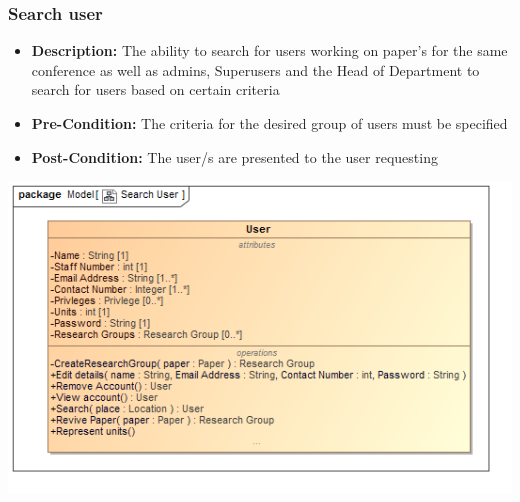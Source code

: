 \documentclass[11pt]{article}
\begin{document}
		\subsubsection{Search user}
		\begin{itemize}
			\item \textbf{Description: }The ability to search for users working on paper's for the same conference as well as admins, Superusers and the Head of Department to search for users based on certain criteria
			\item \textbf{Pre-Condition: }The criteria for the desired group of users must be specified
			\item \textbf{Post-Condition: }The user/s are presented to the user requesting
		\end{itemize}
		\begin{center}
			\includegraphics[width=\textwidth]{../Diagrams/DomainModel/SearchUser.png}\\[0.5cm]
		\end{center}
		\newpage
\end{document}

